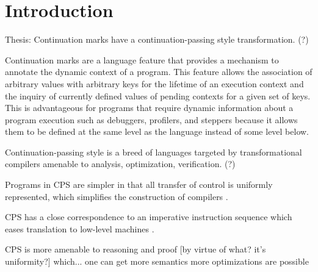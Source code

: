 \documentclass[ms]{byuprop}
\title{\Title}
\author{\Author}
\begin{document}
\maketitle



\section{Introduction}


Thesis: Continuation marks have a continuation-passing style transformation. (?)


Continuation marks \cite{clements2006portable} are a language feature that provides a
mechanism to annotate the dynamic context of a program. This feature allows the
association of arbitrary values with arbitrary keys for the lifetime of an execution
context and the inquiry of currently defined values of pending contexts for a given set of
keys. This is advantageous for programs that require dynamic information about a program
execution such as debuggers, profilers, and steppers because it allows them to be defined
at the same level as the language instead of some level below.

Continuation-passing style is a breed of languages targeted by transformational compilers 
amenable to analysis, optimization, verification. (?) 

Programs in CPS are simpler in that all transfer of control is uniformly represented, which simplifies the construction of compilers \cite{sabry1994formal}.

CPS has a close correspondence to an imperative instruction sequence which eases translation to low-level machines \cite{appel2007compiling}.

CPS is more amenable to reasoning and proof [by virtue of what? it's uniformity?] which...
one can get more semantics \cite{strachey2000continuations}
more optimizations are possible \cite{plotkin1975call}
\end{document}
